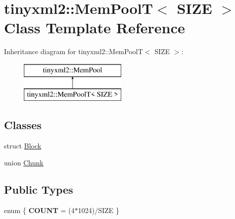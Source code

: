 \hypertarget{classtinyxml2_1_1_mem_pool_t}{}\section{tinyxml2\+:\+:Mem\+PoolT$<$ S\+I\+ZE $>$ Class Template Reference}
\label{classtinyxml2_1_1_mem_pool_t}
Inheritance diagram for tinyxml2\+:\+:Mem\+PoolT$<$ S\+I\+ZE $>$\+:\begin{figure}[H]
\begin{center}
\leavevmode
\includegraphics[height=2.000000cm]{classtinyxml2_1_1_mem_pool_t}
\end{center}
\end{figure}
\subsection*{Classes}
\begin{DoxyCompactItemize}
\item 
struct \hyperlink{structtinyxml2_1_1_mem_pool_t_1_1_block}{Block}
\item 
union \hyperlink{uniontinyxml2_1_1_mem_pool_t_1_1_chunk}{Chunk}
\end{DoxyCompactItemize}
\subsection*{Public Types}
\begin{DoxyCompactItemize}
\item 
enum \{ {\bfseries C\+O\+U\+NT} = (4$\ast$1024)/\+S\+I\+ZE
 \}\hypertarget{classtinyxml2_1_1_mem_pool_t_ac4e51b480c5ce4f88e862f394efb930b}{}\label{classtinyxml2_1_1_mem_pool_t_ac4e51b480c5ce4f88e862f394efb930b}

\end{DoxyCompactItemize}
